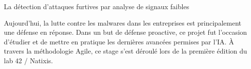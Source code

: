 La détection d'attaques furtives par analyse de signaux faibles

Aujourd'hui, la lutte contre les malwares dans les entreprises est principalement une défense en réponse. Dans un but de défense proactive, ce projet fut l'occasion d'étudier et de mettre en pratique les dernières avancées permises par l'IA.
À travers la méthodologie Agile, ce stage s'est déroulé lors de la première édition du lab 42 / Natixis.

\sectionspace
